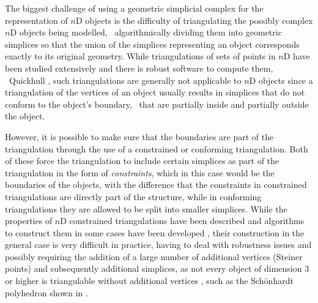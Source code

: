 The biggest challenge of using a geometric simplicial complex for the representation of $n$D objects is the difficulty of triangulating the possibly complex $n$D objects being modelled, \ie\ algorithmically dividing them into geometric simplices so that the union of the simplices representing an object corresponds exactly to its original geometry.
While triangulations of sets of points in $n$D have been studied extensively and there is robust software to compute them, \eg\ Quickhull \citep{Barber96}, such triangulations are generally not applicable to $n$D objects since a triangulation of the vertices of an object usually results in simplices that do not conform to the object's boundary, \ie\ that are partially inside and partially outside the object.

However, it is possible to make sure that the boundaries are part of the triangulation through the use of a constrained or conforming triangulation.
Both of these force the triangulation to include certain simplices as part of the triangulation in the form of \emph{constraints}, which in this case would be the boundaries of the objects, with the difference that the constraints in constrained triangulations are directly part of the structure, while in conforming triangulations they are allowed to be split into smaller simplices.
While the properties of $n$D constrained triangulations have been described \citep{Shewchuk07} and algorithms to construct them in some cases have been developed \citep{Shewchuk00}, their construction in the general case is very difficult in practice, having to deal with robustness issues and possibly requiring the addition of a large number of additional vertices (Steiner points) and subsequently additional simplices, as not every object of dimension 3 or higher is triangulable without additional vertices \citep{Ruppert92}, such as the Sch\"onhardt polyhedron shown in .
